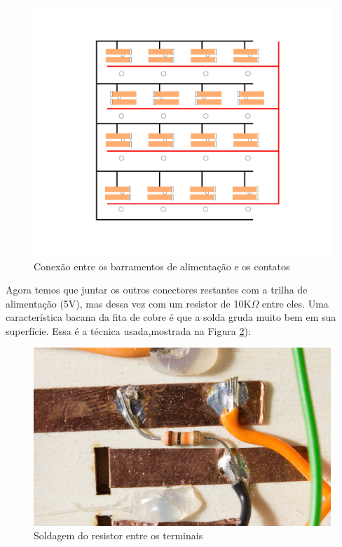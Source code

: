 \documentclass[paper=a4, fontsize=11pt]{scrartcl} %
\numberwithin{equation}{section} %
\numberwithin{figure}{section} %
\numberwithin{table}{section} %
\begin{document}
 \begin{figure}[H] %
   \centering
   \includegraphics[scale=0.15]{./imagens/board-5.jpg}
   \caption[ ]{Conexão entre os barramentos de alimentação e os contatos }
   \label{fig:conexão alimentação}
   \end{figure}
   
Agora temos que juntar os outros conectores restantes com a trilha de alimentação (5V), mas dessa vez com um resistor de 10K$\Omega$  entre eles. Uma característica bacana da fita de cobre é que a solda gruda muito bem em sua superfície. Essa é a técnica usada,mostrada na Figura \ref{fig:conexão resistor 10k}):   
 
  \begin{figure}[H] %
    \centering
    \includegraphics[scale=0.10]{./imagens/diy-docs-1.jpg}
    \caption[ ]{Soldagem do resistor entre os terminais }
    \label{fig:conexão resistor 10k}
   \end{figure}
   
\end{document}
